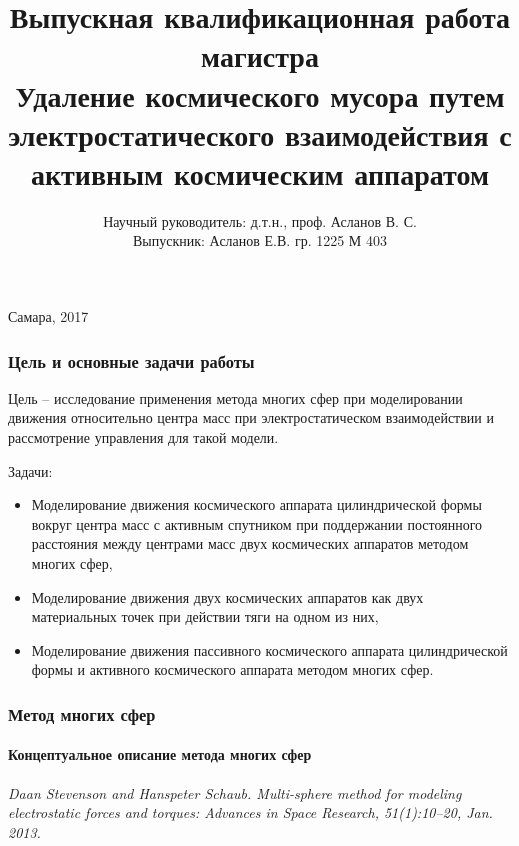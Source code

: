 \documentclass[10pt,pdf,hyperref={unicode}]{beamer}
\title[Удаление космического мусора путем электростатического взаимодействия с активным КА]{Выпускная квалификационная работа магистра\\
Удаление космического мусора путем электростатического взаимодействия с активным космическим аппаратом}
\author[Асланов Е.В.]{Научный руководитель: д.т.н., проф. Асланов В. С.\\
Выпускник: Асланов Е.В. гр. 1225 М 403}
\date[]{}
\begin{document}
\begin{frame}
	\titlepage
	\begin{center}
		Самара, 2017
	\end{center}
\end{frame} 

\begin{frame}
\frametitle{Цель и основные задачи работы}
		Цель – исследование применения метода многих сфер при моделировании движения относительно центра масс при электростатическом взаимодействии и рассмотрение управления для такой модели.
		
		Задачи:
		\begin{itemize}
				\item Моделирование движения космического аппарата цилиндрической формы вокруг центра масс с активным спутником при поддержании постоянного расстояния между центрами масс двух космических аппаратов методом многих сфер,
				\item Моделирование движения двух космических аппаратов как двух материальных точек при действии тяги на одном из них,
				\item Моделирование движения пассивного космического аппарата цилиндрической формы и активного космического аппарата методом многих сфер.
		\end{itemize}
\end{frame}

\begin{frame}
\frametitle{Метод  многих сфер}
\framesubtitle{Концептуальное описание метода многих сфер}
	\begin{figure}[H]
	\end{figure}
	\footnotesize{\textit{Daan Stevenson and Hanspeter Schaub. Multi-sphere method for modeling electrostatic forces and torques: Advances in Space Research, 51(1):10–20, Jan. 2013.}}
\end{frame}
\end{document}
